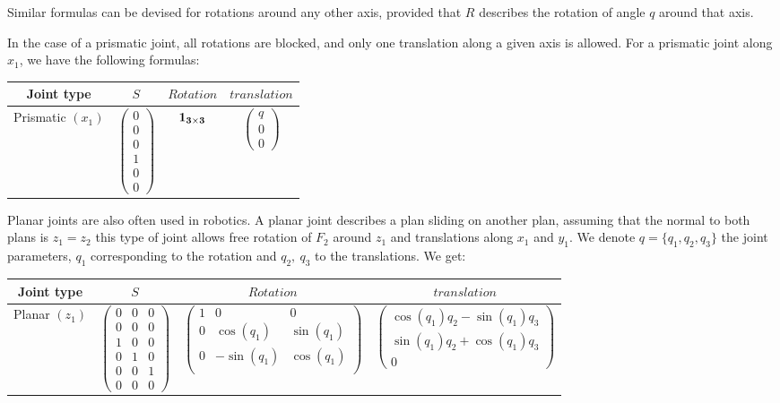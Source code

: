 Similar formulas can be devised for rotations around any other axis, provided that $R$ describes the rotation of angle $q$ around that axis.

In the case of a prismatic joint, all rotations are blocked, and only one translation along a given axis is allowed.
For a prismatic joint along $x_1$, we have the following formulas:

\begin{tabular}{|c|c|c|c|}
  \hline
  Joint type & $S$ & $Rotation$ & $translation$ \\
  \hline
  Prismatic $(x_1)$
  &
  $\begin{pmatrix}
    0 \\ 0 \\ 0 \\ 1 \\ 0 \\ 0
  \end{pmatrix}$
  &
  $\bf{1}_{3\times3} $
  &
  $\begin{pmatrix}
    q \\ 0 \\ 0
  \end{pmatrix}$
  \\
  \hline
\end{tabular}

Planar joints are also often used in robotics. A planar joint describes a plan sliding on another plan, assuming that the normal to both plans is $z_1 = z_2$ this type of joint allows free rotation of $F_2$ around $z_1$ and translations along $x_1$ and $y_1$. We denote $q = \{q_1, q_2, q_3\}$ the joint parameters, $q_1$ corresponding to the rotation and $q_2,\ q_3$ to the translations. We get:

\begin{tabular}{|c|c|c|c|}
  \hline
  Joint type & $S$ & $Rotation$ & $translation$ \\
  \hline
  Planar $(z_1)$
  &
  $\begin{pmatrix}
    0 & 0 & 0 \\ 0 & 0 & 0 \\ 1 & 0 & 0 \\ 0 & 1 & 0 \\ 0 & 0 & 1 \\ 0 & 0 & 0
  \end{pmatrix}$
  &
  $\begin{pmatrix}
    1 & 0 & 0 \\
    0 & \cos(q_1) & \sin(q_1) \\
    0 & -\sin(q_1) & \cos(q_1) \\
  \end{pmatrix}$
  &
  $\begin{pmatrix}
    \cos(q_1)q_2 - \sin(q_1)q_3 \\ \sin(q_1)q_2 + \cos(q_1)q_3 \\ 0
  \end{pmatrix}$
  \\
  \hline
\end{tabular}

